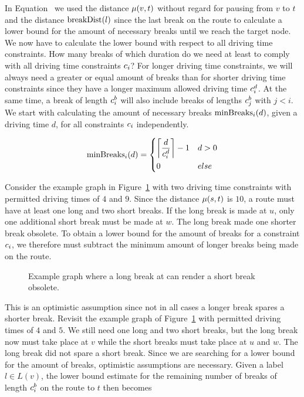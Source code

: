 In Equation~ we used the distance $\distance(v,t)$ without regard for pausing from $v$ to $t$ and the distance $\breakDist(l)$ since the last break on the route to calculate a lower bound for the amount of necessary breaks until we reach the target node. We now have to calculate the lower bound with respect to all driving time constraints. How many breaks of which duration do we need at least to comply with all driving time constraints $\restr_i$? For longer driving time constraints, we will always need a greater or equal amount of breaks than for shorter driving time constraints since they have a longer maximum allowed driving time $\restr_i^d$. At the same time, a break of length $\restr_i^b$ will also include breaks of lengths $\restr_j^b$ with $j < i$. We start with calculating the amount of necessary breaks $\minBreaks_i(d)$, given a driving time $d$, for all constraints $\restr_i$ independently.

\begin{align}\label{eq:min_breaks_n}
	\minBreaks_i(d) = \begin{dcases}
		\ceil*{ \frac{d}{\restr_i^d} } - 1 & d > 0 \\
		0                                  & else
	\end{dcases}
\end{align}

Consider the example graph in Figure~\ref{fig:graph_short_long_break} with two driving time constraints with permitted driving times of $4$ and $9$. Since the distance $\distance(s,t)$ is $10$, a route must have at least one long and two short breaks. If the long break is made at $u$, only one additional short break must be made at $w$. The long break made one shorter break obsolete. To obtain a lower bound for the amount of breaks for a constraint $\restr_i$, we therefore must subtract the minimum amount of longer breaks being made on the route.

\begin{figure}[hbtp]
	\centering
	
	\caption{Example graph where a long break at can render a short break obsolete.}
	\label{fig:graph_short_long_break}
\end{figure}

This is an optimistic assumption since not in all cases a longer break spares a shorter break. Revisit the example graph of Figure~\ref{fig:graph_short_long_break} with permitted driving times of $4$ and $5$. We still need one long and two short breaks, but the long break now must take place at $v$ while the short breaks must take place at $u$ and $w$. The long break did not spare a short break. Since we are searching for a lower bound for the amount of breaks, optimistic assumptions are necessary. Given a label $l \in L(v)$, the lower bound estimate for the remaining number of breaks of length $\restr_i^b$ on the route to $t$ then becomes

